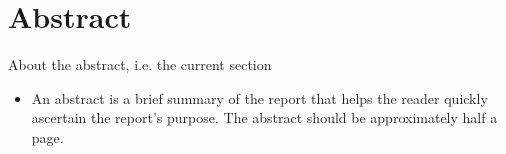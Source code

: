 \documentclass[Main]{subfiles}
\begin{document}
\chapter*{Abstract}

About the abstract, i.e. the current section
\begin{itemize}
\item An abstract is a brief summary of the report that helps the
  reader quickly ascertain the report's purpose. The abstract should
  be approximately half a page.
\end{itemize}


\setcounter{tocdepth}{1}
\tableofcontents

\listoffixmes
\end{document}
